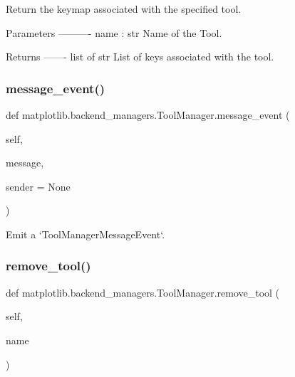 \begin{DoxyVerb}Return the keymap associated with the specified tool.

Parameters
----------
name : str
    Name of the Tool.

Returns
-------
list of str
    List of keys associated with the tool.
\end{DoxyVerb}
 \mbox{\label{classmatplotlib_1_1backend__managers_1_1ToolManager_a2dee0fa838b2e1457c37f680569498ad}} 
\subsubsection{\texorpdfstring{message\+\_\+event()}{message\_event()}}
{\footnotesize\ttfamily def matplotlib.\+backend\+\_\+managers.\+Tool\+Manager.\+message\+\_\+event (\begin{DoxyParamCaption}\item[{}]{self,  }\item[{}]{message,  }\item[{}]{sender = {\ttfamily None} }\end{DoxyParamCaption})}

\begin{DoxyVerb}Emit a `ToolManagerMessageEvent`.\end{DoxyVerb}
 \mbox{\label{classmatplotlib_1_1backend__managers_1_1ToolManager_a74762e8ff793ceca77b6b1b43ce84d3c}} 
\subsubsection{\texorpdfstring{remove\+\_\+tool()}{remove\_tool()}}
{\footnotesize\ttfamily def matplotlib.\+backend\+\_\+managers.\+Tool\+Manager.\+remove\+\_\+tool (\begin{DoxyParamCaption}\item[{}]{self,  }\item[{}]{name }\end{DoxyParamCaption})}

